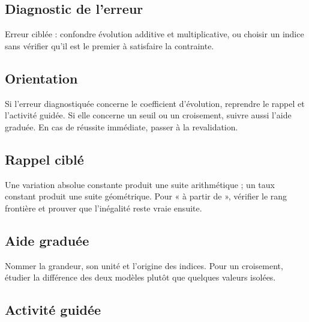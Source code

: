 

\subsection*{Diagnostic de l'erreur}
Erreur ciblée : confondre évolution additive et multiplicative, ou choisir un
indice sans vérifier qu'il est le premier à satisfaire la contrainte.

\subsection*{Orientation}
Si l'erreur diagnostiquée concerne le coefficient d'évolution, reprendre le
rappel et l'activité guidée. Si elle concerne un seuil ou un croisement,
suivre aussi l'aide graduée. En cas de réussite immédiate, passer à la
revalidation.

\subsection*{Rappel ciblé}
Une variation absolue constante produit une suite arithmétique ; un taux
constant produit une suite géométrique. Pour « à partir de », vérifier le rang
frontière et prouver que l'inégalité reste vraie ensuite.

\subsection*{Aide graduée}
Nommer la grandeur, son unité et l'origine des indices. Pour un croisement,
étudier la différence des deux modèles plutôt que quelques valeurs isolées.

\subsection*{Activité guidée}

